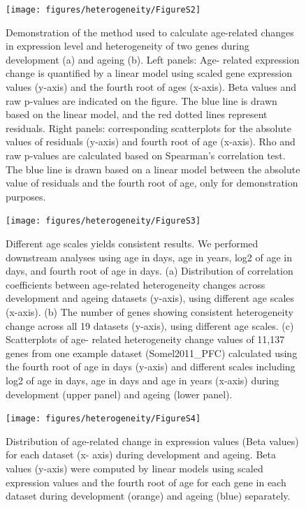 \documentclass[12pt,twoside]{unicam}
\begin{document}
\begin{figure}

{\centering \texttt{[image: figures/heterogeneity/FigureS2]} 

}

\caption[Demonstration of the methods to calculate age-related changes in the expression level and heterogeneity]{Demonstration of the method used to calculate age-related changes in expression level and heterogeneity of two genes during development (a) and ageing (b). Left panels: Age- related expression change is quantified by a linear model using scaled gene expression values (y-axis) and the fourth root of ages (x-axis). Beta values and raw p-values are indicated on the figure. The blue line is drawn based on the linear model, and the red dotted lines represent residuals. Right panels: corresponding scatterplots for the absolute values of residuals (y-axis) and fourth root of age (x-axis). Rho and raw p-values are calculated based on Spearman's correlation test. The blue line is drawn based on a linear model between the absolute value of residuals and the fourth root of age, only for demonstration purposes.}\label{fig:hetFigS2}
\end{figure}

\begin{figure}

{\centering \texttt{[image: figures/heterogeneity/FigureS3]} 

}

\caption[Result summary using different age scales.]{Different age scales yields consistent results. We performed downstream analyses using age in days, age in years, log2 of age in days, and fourth root of age in days. (a) Distribution of correlation coefficients between age-related heterogeneity changes across development and ageing datasets (y-axis), using different age scales (x-axis). (b) The number of genes showing consistent heterogeneity change across all 19 datasets (y-axis), using different age scales. (c) Scatterplots of age- related heterogeneity change values of 11,137 genes from one example dataset (Somel2011\_PFC) calculated using the fourth root of age in days (y-axis) and different scales including log2 of age in days, age in days and age in years (x-axis) during development (upper panel) and ageing (lower panel).}\label{fig:hetFigS3}
\end{figure}

\begin{figure}

{\centering \texttt{[image: figures/heterogeneity/FigureS4]} 

}

\caption[Distribution of the age-related changes in gene expression level.]{Distribution of age-related change in expression values (Beta values) for each dataset (x- axis) during development and ageing. Beta values (y-axis) were computed by linear models using scaled expression values and the fourth root of age for each gene in each dataset during development (orange) and ageing (blue) separately.}\label{fig:hetFigS4}
\end{figure}
\end{document}
